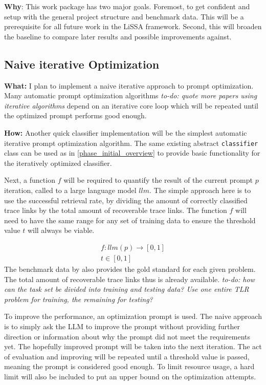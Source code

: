 \textbf{Why}: This work package has two major goals. Foremost, to get confident and setup with the general project structure and benchmark data. This will be a prerequisite for all future work in the LiSSA framework. Second, this will broaden the baseline to compare later results and possible improvements against.


\subsection{Naive iterative Optimization}
\label{phase_naive_iterative}
\textbf{What:} I plan to implement a naive iterative approach to prompt optimization. Many automatic prompt optimization algorithms \citeiterative \textit{to-do: quote more papers using iterative algorithms} depend on an iterative core loop which will be repeated until the optimized prompt performs good enough.

\textbf{How:} Another quick classifier implementation will be the simplest automatic iterative prompt optimization algorithm. The same existing abstract \verb|classifier| class can be used as in \ref{phase_initial_overview} to provide basic functionality for the iteratively optimized classifier.

Next, a function $f$ will be required to quantify the result of the current prompt $p$ iteration, called to a large language model $llm$. The simple approach here is to use the successful retrieval rate, by dividing the amount of correctly classified trace links by the total amount of recoverable trace links.
The function $f$ will need to have the same range for any set of training data to ensure the threshold value $t$ will always be viable.


\begin{align*} 
f: llm(p) \rightarrow [0, 1] \\
t \in [0, 1]
\end{align*}
The benchmark data by  also provides the gold standard for each given problem. The total amount of recoverable trace links thus is already available. \textit{to-do: how can the task set be divided into training and testing data? Use one entire TLR problem for training, the remaining for testing?}

To improve the performance, an optimization prompt is used. The naive approach is to simply ask the LLM to improve the prompt without providing further direction or information about why the prompt did not meet the requirements yet. The hopefully improved prompt will be taken into the next iteration. The act of evaluation and improving will be repeated until a threshold value is passed, meaning the prompt is considered good enough. To limit resource usage, a hard limit will also be included to put an upper bound on the optimization attempts.


